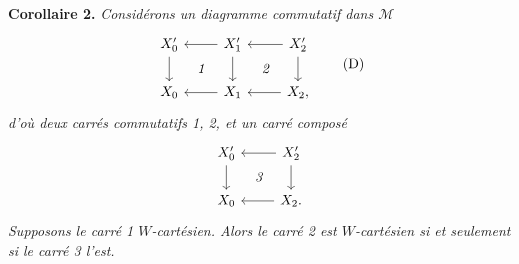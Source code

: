 \textbf{Corollaire 2.} \textit{Considérons un diagramme commutatif dans $\mathcal{M}$}
\[
\begin{tikzcd}[ampersand replacement=\&]
X_0' \arrow[d] \& X_1' \arrow[l] \arrow[d] \arrow[dl, phantom, "\textit{1}"] \& X_2' \arrow[l] \arrow[d] \arrow[dl, phantom, "\textit{2}"] \\
X_0 \& X_1 \arrow[l] \& X_2, \arrow[l]
\end{tikzcd}
\tag*{(D)}
\]
\textit{d'où deux carrés commutatifs 1, 2, et un carré composé}
\[
\begin{tikzcd}[ampersand replacement=\&]
X_0' \arrow[d] \& X_2' \arrow[l] \arrow[d] \arrow[dl, phantom, "\textit{3}"] \\
X_0 \& X_2. \arrow[l]
\end{tikzcd}
\]
\textit{Supposons le carré 1 $W$-cartésien. Alors le carré 2 est $W$-cartésien si et seulement si le carré 3 l'est.}

